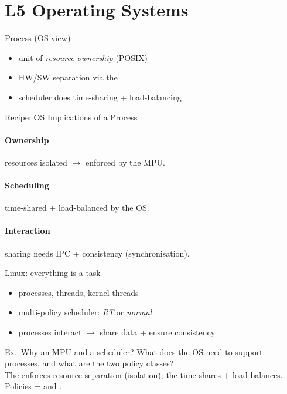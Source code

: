 \section{L5 Operating Systems}


\begin{definition}{Process (OS view)}
    \begin{itemize}
        \item unit of \emph{resource ownership} (POSIX)
        \item HW/SW separation via the 
        \item scheduler does time-sharing + load-balancing
    \end{itemize}
\end{definition}

\begin{KR}{Recipe: OS Implications of a Process}
    \paragraph{Ownership} resources isolated $\to$ enforced by the MPU.
    \paragraph{Scheduling} time-shared + load-balanced by the OS.
    \paragraph{Interaction} sharing needs IPC + consistency (synchronisation).
\end{KR}

\begin{concept}{Linux: everything is a task}
    \begin{itemize}
        \item processes, threads, kernel threads
        \item multi-policy scheduler: \emph{RT} or \emph{normal}
        \item processes interact $\to$ share data + ensure consistency
    \end{itemize}
\end{concept}

\begin{example2}{Ex.\ Why an MPU and a scheduler?}
    What does the OS need to support processes, and what are the two policy classes?
     \\ 
    The  enforces resource separation (isolation); the  time-shares + load-balances. Policies =  and .
\end{example2}

